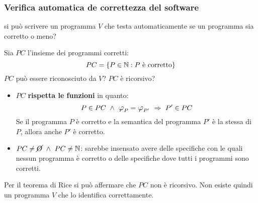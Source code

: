 \subsubsection*{Verifica automatica de correttezza del software}
\begin{description}[leftmargin=1.9cm]
    \item[Problema:] si può scrivere un programma $V$ che testa automaticamente se un programma
    sia corretto o meno?
\end{description}

Sia $PC$ l'insieme dei programmi corretti: $$ PC = \{P\in\mathbb{N}:\text{$P$ è corretto}\} $$
$PC$ può essere riconosciuto da $V$? $PC$ è ricorsivo?

\begin{itemize}
    \item $PC$ \textbf{rispetta le funzioni} in quanto:
    $$P\in PC \ \wedge\ \semRAM_P=\semRAM_{P'} \ \Rightarrow\ P'\in PC$$
    Se il programma $P$ è corretto e la semantica del programma $P'$ è la stessa di $P$, 
    allora anche $P'$ è corretto.
    \item $PC\neq\cancel{O}\ \wedge\ PC\neq\N$: sarebbe insensato avere delle specifiche con le
    quali nessun programma è corretto o delle specifiche dove tutti i programmi sono corretti.
\end{itemize}

Per il teorema di Rice si può affermare che $PC$ non è ricorsivo. Non esiste quindi un
programma $V$ che lo identifica correttamente.